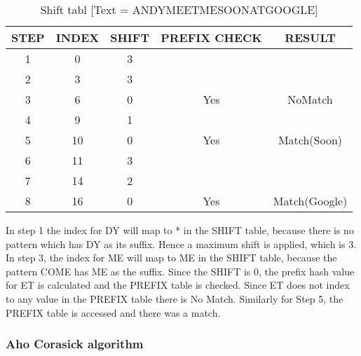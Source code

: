 \begin {table}[h]
\caption {Shift tabl [Text = ANDYMEETMESOONATGOOGLE]} \label{tab:title} 
\begin{tabular}{|c|c|c|c|c|} 
	\midrule
	STEP & INDEX & SHIFT & PREFIX CHECK & RESULT\\
	\midrule
	1 & 0 & 3\\
	\midrule
	2 & 3 & 3\\
	\midrule
	3 & 6 & 0 & Yes & NoMatch\\
	\midrule 
	4 & 9 & 1\\
	\midrule
	5 & 10 & 0 & Yes & Match(Soon)\\
	\midrule
	6 & 11 & 3\\
	\midrule
	7 & 14 & 2\\
	\midrule
	8 & 16 & 0 & Yes & Match(Google)\\
	\midrule
\end{tabular}
\end{table}

In step 1 the index for DY will map to * in the SHIFT table, because there is no pattern which has DY as its suffix. Hence a maximum shift is applied, which is 3.
In step 3, the index for ME will map to ME in the SHIFT table, because the pattern COME has ME as the suffix. Since the SHIFT is 0, the prefix hash value for ET is calculated and the PREFIX table is checked. Since ET does not index to any value in the PREFIX table there is No Match. Similarly for Step 5, the PREFIX table is accessed and there was a match.

\subsubsection{Aho Corasick algorithm}